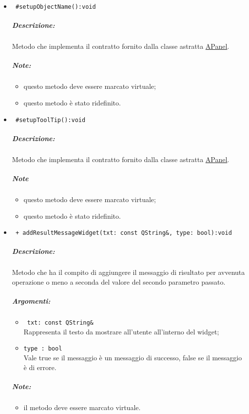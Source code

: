 \begin{itemize}
\item \color{blue}\verb! #setupObjectName():void!
\color{black}
\subparagraph{Descrizione:}Metodo che implementa il contratto fornito dalla classe astratta \hyperref[speAPanel]{APanel}.\\
 \subparagraph{Note:}
 \begin{itemize}
  \item questo metodo deve essere marcato virtuale;
 \item questo metodo è stato ridefinito.
 \end{itemize}

\item \color{blue}\verb! #setupToolTip():void!
\color{black}
\subparagraph{Descrizione:}
Metodo che implementa il contratto fornito dalla classe astratta \hyperref[speAPanel]{APanel}.\\
 \subparagraph{Note}
 \begin{itemize}
 \item questo metodo deve essere marcato virtuale;
 \item questo metodo è stato ridefinito.
 \end{itemize}


\item \color{blue} \verb! + addResultMessageWidget(txt: const QString&, type: bool):void! \\
\color{black}
\subparagraph{Descrizione:} Metodo che ha il compito di aggiungere il messaggio di risultato per avvenuta operazione o meno a seconda del valore del secondo parametro passato.
\subparagraph{Argomenti:}
\begin{itemize}
\item \color{RoyalPurple} \verb! txt: const QString& ! \\Rappresenta il testo da mostrare all'utente all'interno del widget;
\item \color{RoyalPurple} \verb!type : bool ! \\ Vale true se il messaggio è un messaggio di successo, false se il messaggio è di errore.
\end{itemize}
\subparagraph{Note:}
\begin{itemize}
\item il metodo deve essere marcato virtuale.
\end{itemize}


\end{itemize}
